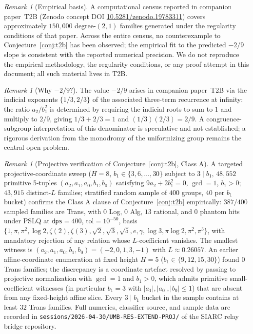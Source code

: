 \documentclass[11pt,a4paper]{article}
\theoremstyle{definition}
\theoremstyle{remark}
\newtheorem{remark}[conjecture]{Remark}
\begin{document}
\begin{remark}[Empirical basis]
\label{rem:empirical}
A computational census reported in companion paper~T2B
(Zenodo concept DOI \href{https://doi.org/10.5281/zenodo.19783311}{10.5281/zenodo.19783311})
covers approximately $150{,}000$ degree-$(2,1)$ families generated
under the regularity conditions of that paper. Across the entire
census, no counterexample to Conjecture~\ref{conj:t2b} has been
observed; the empirical fit to the predicted $-2/9$ slope is consistent
with the reported numerical precision. We do not reproduce the
empirical methodology, the regularity conditions, or any proof
attempt in this document; all such material lives in T2B.
\end{remark}

\begin{remark}[Why $-2/9$?]
The value $-2/9$ arises in companion paper~T2B via the
indicial exponents $\{1/3, 2/3\}$ of the associated
three-term recurrence at infinity: the ratio $a_2/b_1^2$
is determined by requiring the indicial roots to sum to
$1$ and multiply to $2/9$, giving $1/3 + 2/3 = 1$ and
$(1/3)(2/3) = 2/9$. A congruence-subgroup interpretation
of this denominator is speculative and not established;
a rigorous derivation from the monodromy of the
uniformizing group remains the central open problem.
\end{remark}

\begin{remark}[Projective verification of Conjecture~\ref{conj:t2b}, Class A]
\label{rem:projective-verify}
A targeted projective-coordinate sweep
($H = 8$, $b_1 \in \{3, 6, \ldots, 30\}$ subject to $3 \mid b_1$,
$48{,}552$ primitive 5-tuples
$(a_2, a_1, a_0, b_1, b_0)$ satisfying $9 a_2 + 2 b_1^2 = 0$,
$\gcd = 1$, $b_1 > 0$; $43{,}915$ distinct-$L$ families;
stratified random sample of $400$ groups, $40$ per $b_1$ bucket)
confirms the Class A clause of Conjecture~\ref{conj:t2b}
empirically: $387/400$ sampled families are Trans, with
$0$ Log, $0$ Alg, $13$ rational, and $0$ phantom hits
under PSLQ at \texttt{dps}$=400$, $\mathrm{tol} = 10^{-50}$,
basis $\{1, \pi, \pi^2, \log 2, \zeta(2), \zeta(3),
\sqrt{2}, \sqrt{3}, \sqrt{5}, e, \gamma, \log 3,
\pi \log 2, \pi^2, \pi^3\}$, with mandatory rejection of any
relation whose $L$-coefficient vanishes. The smallest
witness is
$(a_2, a_1, a_0, b_1, b_0) = (-2, 0, 1, 3, -1)$ with
$L \approx 0.26057$. An earlier affine-coordinate
enumeration at fixed height $H = 5$
($b_1 \in \{9, 12, 15, 30\}$) found $0$ Trans families;
the discrepancy is a coordinate artefact resolved by passing
to projective normalization with $\gcd = 1$ and $b_1 > 0$,
which admits primitive small-coefficient witnesses
(in particular $b_1 = 3$ with $|a_1|, |a_0|, |b_0| \leq 1$)
that are absent from any fixed-height affine slice.
Every $3 \mid b_1$ bucket in the sample contains at least
$32$ Trans families. Full numerics, classifier source, and
sample data are recorded in
\texttt{sessions/2026-04-30/UMB-RES-EXTEND-PROJ/} of the
SIARC relay bridge repository.
\end{remark}
\end{document}
